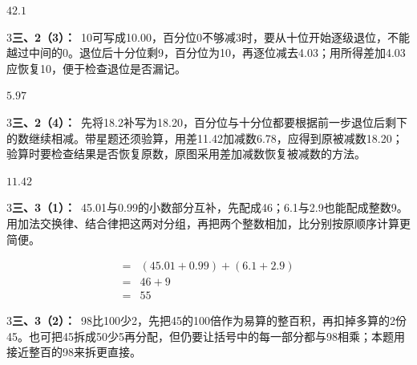 \documentclass[multi=snippet,border={5bp 20bp 5bp 5bp}]{standalone}
\newenvironment{snippet}[3]{\begin{minipage}{#1bp}\color{answerred}\fontsize{#2}{#3}\selectfont\raggedright}{\end{minipage}}
\begin{document}
\begin{snippet}{32.75}{10}{14}\SourceSans\setlength{\mathindent}{2bp}\(42.1\)\end{snippet}
\begin{snippet}{505}{11.5}{14}\begin{multicols}{3}\raggedcolumns \textbf{三、2（3）：}\ 10可写成10.00，百分位0不够减3时，要从十位开始逐级退位，不能越过中间的0。退位后十分位剩9，百分位为10，再逐位减去4.03；用所得差加4.03应恢复10，便于检查退位是否漏记。\end{multicols}\end{snippet}
\begin{snippet}{25.5}{10}{14}\SourceSans\setlength{\mathindent}{2bp}\(5.97\)\end{snippet}
\begin{snippet}{505}{11.5}{14}\begin{multicols}{3}\raggedcolumns \textbf{三、2（4）：}\ 先将18.2补写为18.20，百分位与十分位都要根据前一步退位后剩下的数继续相减。带星题还须验算，用差11.42加减数6.78，应得到原被减数18.20；验算时要检查结果是否恢复原数，原图采用差加减数恢复被减数的方法。\end{multicols}\end{snippet}
\begin{snippet}{34.25}{10}{14}\SourceSans\setlength{\mathindent}{2bp}\(11.42\)\end{snippet}
\begin{snippet}{505}{11.5}{14}\begin{multicols}{3}\raggedcolumns \textbf{三、3（1）：}\ 45.01与0.99的小数部分互补，先配成46；6.1与2.9也能配成整数9。用加法交换律、结合律把这两对分组，再把两个整数相加，比分别按原顺序计算更简便。\end{multicols}\end{snippet}
\begin{snippet}{208.9}{10.5}{12.8}\SourceSans\setlength{\mathindent}{2bp}\[\begin{aligned}={}&(45.01+0.99)+(6.1+2.9)\\={}&46+9\\={}&55\end{aligned}\]\end{snippet}
\begin{snippet}{505}{11.5}{14}\begin{multicols}{3}\raggedcolumns \textbf{三、3（2）：}\ 98比100少2，先把45的100倍作为易算的整百积，再扣掉多算的2份45。也可把45拆成50少5再分配，但仍要让括号中的每一部分都与98相乘；本题用接近整百的98来拆更直接。\end{multicols}\end{snippet}
\end{document}
